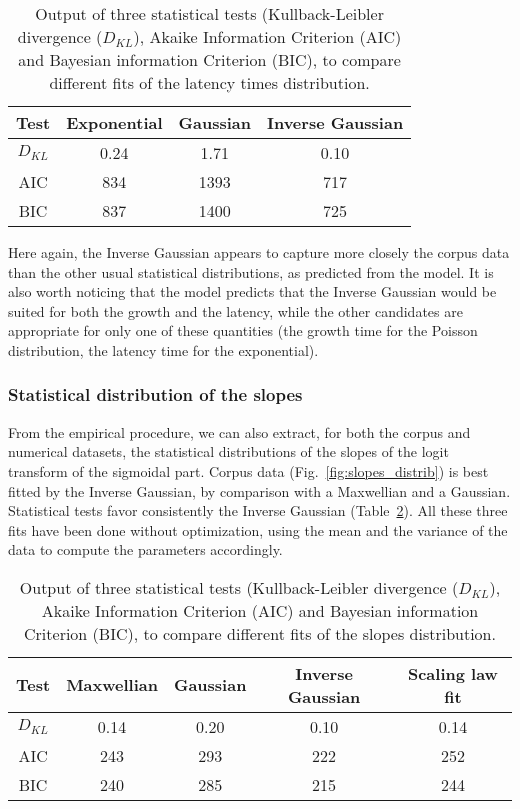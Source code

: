 \documentclass[12pt,twocolumn,amsmath,amssymb,aps,longbibliography]{revtex4-1}  %
\begin{document}
\begin{table}
\centering
\caption{Output of three statistical tests (Kullback-Leibler divergence ($D_{KL}$), Akaike Information Criterion (AIC) and Bayesian information Criterion (BIC), to compare different fits of the latency times distribution.}
\label{table:latency_test}
\begin{tabular}{|c|c|c|c|}
\hline
Test & Exponential & Gaussian & Inverse Gaussian \\ \hline
$D_{KL}$ & 0.24  & 1.71 & 0.10 \\ \hline
AIC & 834  & 1393  & 717 \\ \hline
BIC & 837  & 1400  & 725  \\ \hline
\end{tabular}
\end{table}

Here again, the Inverse Gaussian appears to capture more closely the corpus data than the other usual statistical distributions, as predicted from the model. It is also worth noticing that the model predicts that the Inverse Gaussian would be suited for both the growth and the latency, while the other candidates are appropriate for only one of these quantities (the growth time for the Poisson distribution, the latency time for the exponential).

\subsubsection{Statistical distribution of the slopes}

From the empirical procedure, we can also extract, for both the corpus and numerical datasets, the statistical distributions of the slopes of the logit transform of the sigmoidal part. Corpus data (Fig.~\ref{fig:slopes_distrib}) is best fitted by the Inverse Gaussian, by comparison with a Maxwellian and a Gaussian. Statistical tests favor consistently the Inverse Gaussian (Table~\ref{table:slopes_test}). All these three fits have been done without optimization, using the mean and the variance of the data to compute the parameters accordingly. 

\begin{table}
\centering
\caption{Output of three statistical tests (Kullback-Leibler divergence ($D_{KL}$), Akaike Information Criterion (AIC) and Bayesian information Criterion (BIC), to compare different fits of the slopes distribution.}
\label{table:slopes_test}
\begin{tabular}{|c|c|c|c|c|}
\hline
Test & Maxwellian & Gaussian & Inverse Gaussian & Scaling law fit \\ \hline
$D_{KL}$ & 0.14  & 0.20 & 0.10 & 0.14 \\ \hline
AIC & 243  & 293  & 222 & 252 \\ \hline
BIC & 240  & 285  & 215 & 244  \\ \hline
\end{tabular}
\end{table}
\end{document}
